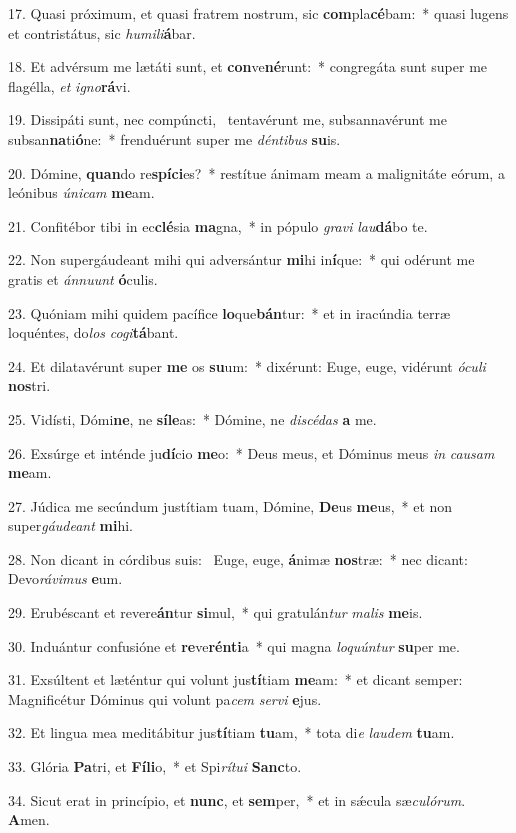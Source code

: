 17. Quasi próximum, et quasi fratrem nostrum, sic \textbf{com}pla\textbf{cé}bam:~*  quasi lugens et contristátus, sic \textit{hu}\textit{mi}\textit{li}\textbf{á}bar.\

18. Et advérsum me lætáti sunt, et \textbf{con}ve\textbf{né}runt:~*  congregáta sunt super me flagélla, \textit{et} \textit{i}\textit{gno}\textbf{rá}vi.\

19. Dissipáti sunt, nec compúncti, \dag\  tentavérunt me, subsannavérunt me subsan\textbf{na}ti\textbf{ó}ne:~*  frenduérunt super me \textit{dén}\textit{ti}\textit{bus} \textbf{su}is.\

20. Dómine, \textbf{quan}do re\textbf{spí}\textbf{ci}es?~*  restítue ánimam meam a malignitáte eórum, a leónibus \textit{ú}\textit{ni}\textit{cam} \textbf{me}am.\

21. Confitébor tibi in ec\textbf{clé}sia \textbf{ma}gna,~*  in pópulo \textit{gra}\textit{vi} \textit{lau}\textbf{dá}bo te.\

22. Non supergáudeant mihi qui adversántur \textbf{mi}hi in\textbf{í}que:~*  qui odérunt me gratis et \textit{án}\textit{nu}\textit{unt} \textbf{ó}culis.\

23. Quóniam mihi quidem pacífice \textbf{lo}que\textbf{bán}tur:~*  et in iracúndia terræ loquéntes, do\textit{los} \textit{co}\textit{gi}\textbf{tá}bant.\

24. Et dilatavérunt super \textbf{me} os \textbf{su}um:~*  dixérunt: Euge, euge, vidérunt \textit{ó}\textit{cu}\textit{li} \textbf{nos}tri.\

25. Vidísti, Dómi\textbf{ne}, ne \textbf{sí}\textbf{le}as:~*  Dómine, ne \textit{di}\textit{scé}\textit{das} \textbf{a} me.\

26. Exsúrge et inténde ju\textbf{dí}cio \textbf{me}o:~*  Deus meus, et Dóminus meus \textit{in} \textit{cau}\textit{sam} \textbf{me}am.\

27. Júdica me secúndum justítiam tuam, Dómine, \textbf{De}us \textbf{me}us,~*  et non super\textit{gáu}\textit{de}\textit{ant} \textbf{mi}hi.\

28. Non dicant in córdibus suis: \dag\  Euge, euge, \textbf{á}nimæ \textbf{nos}træ:~*  nec dicant: Devo\textit{rá}\textit{vi}\textit{mus} \textbf{e}um.\

29. Erubéscant et revere\textbf{án}tur \textbf{si}mul,~*  qui gratulán\textit{tur} \textit{ma}\textit{lis} \textbf{me}is.\

30. Induántur confusióne et \textbf{re}ve\textbf{rén}\textbf{ti}a~*  qui magna \textit{lo}\textit{quún}\textit{tur} \textbf{su}per me.\

31. Exsúltent et læténtur qui volunt jus\textbf{tí}tiam \textbf{me}am:~*  et dicant semper: Magnificétur Dóminus qui volunt pa\textit{cem} \textit{ser}\textit{vi} \textbf{e}jus.\

32. Et lingua mea meditábitur jus\textbf{tí}tiam \textbf{tu}am,~*  tota di\textit{e} \textit{lau}\textit{dem} \textbf{tu}am.\

33. Glória \textbf{Pa}tri, et \textbf{Fí}\textbf{li}o,~*  et Spi\textit{rí}\textit{tu}\textit{i} \textbf{Sanc}to.\

34. Sicut erat in princípio, et \textbf{nunc}, et \textbf{sem}per,~*  et in sǽcula sæ\textit{cu}\textit{ló}\textit{rum}. \textbf{A}men.\

